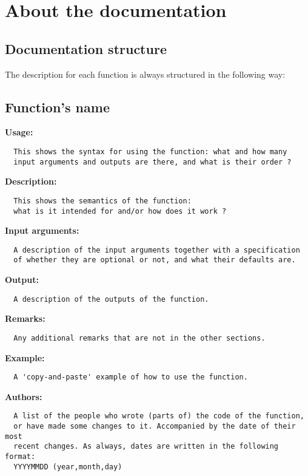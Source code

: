 
\chapter{About the documentation}

\hypertarget{FuncRef:DocumentationStructure}{
\section{Documentation structure}}

The description for each function is always structured in the
following way:

\section*{Function's name}

\textbf{Usage:}
\begin{verbatim}  This shows the syntax for using the function: what and how many
  input arguments and outputs are there, and what is their order ?
\end{verbatim}
\textbf{Description:}
\begin{verbatim}  This shows the semantics of the function:
  what is it intended for and/or how does it work ?
\end{verbatim}
\textbf{Input arguments:}
\begin{verbatim}  A description of the input arguments together with a specification
  of whether they are optional or not, and what their defaults are.
\end{verbatim}
\textbf{Output:}
\begin{verbatim}  A description of the outputs of the function.
\end{verbatim}
\textbf{Remarks:}
\begin{verbatim}  Any additional remarks that are not in the other sections.
\end{verbatim}
\textbf{Example:}
\begin{verbatim}  A 'copy-and-paste' example of how to use the function.
\end{verbatim}
\textbf{Authors:}
\begin{verbatim}  A list of the people who wrote (parts of) the code of the function,
  or have made some changes to it. Accompanied by the date of their most
  recent changes. As always, dates are written in the following format:
  YYYYMMDD (year,month,day)
\end{verbatim}


